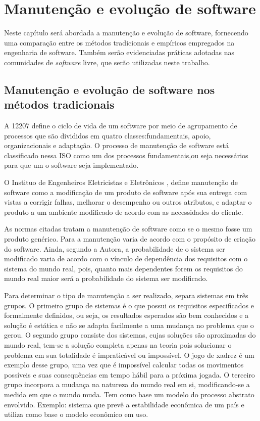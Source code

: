 \chapter{Manutenção e evolução de software}
\label{cap-evol-software}

Neste capítulo será abordada a manutenção e evolução de software, fornecendo uma comparação entre os métodos tradicionais e empíricos empregados na engenharia de software. Também serão evidenciadas práticas adotadas nas comunidades de \textit{software} livre, que serão utilizadas neste trabalho.

\section{Manutenção e evolução de software nos métodos tradicionais}
\label{sect-manut-evol-soft}

A  12207 define o ciclo de vida de um software por meio de agrupamento de processos que são divididos em quatro classes:fundamentais, apoio, organizacionais e adaptação. O processo de manutenção de software está classificado nessa ISO como um dos processos fundamentais,ou seja necessários para que um o software seja implementado.


O Instituo de Engenheiros Eletricistas e Eletrônicos , define manutenção de software como a modificação de um produto de software após sua entrega com vistas a corrigir falhas, melhorar o desempenho ou outros atributos, e adaptar o produto a um ambiente modificado de acordo com as necessidades do cliente.

As normas citadas tratam a manutenção de software como se o mesmo fosse um produto genérico. Para  a manutenção varia de acordo com o propósito de criação do software. Ainda, segundo a Autora, a probabilidade de o sistema ser modificado varia de acordo com o vínculo de dependência dos requisitos com o sistema do mundo real, pois, quanto mais dependentes forem os requisitos do mundo real maior será a probabilidade do sistema ser modificado.

Para determinar o tipo de manutenção a ser realizado,  separa sistemas em três grupos. O primeiro grupo de sistemas é o que possui os requisitos especificados e formalmente definidos, ou seja, os resultados esperados são bem conhecidos e a solução é estática e não se adapta facilmente a uma mudança no problema que o gerou. O segundo grupo consiste dos sistemas, cujas soluções são aproximadas do mundo real, tem-se a solução completa apenas na teoria pois solucionar o problema em sua totalidade é impraticável ou impossível. O jogo de xadrez é um exemplo desse grupo, uma vez que é impossível calcular todas os movimentos possíveis e suas consequências em tempo hábil para a próxima jogada. O terceiro grupo incorpora a mudança na natureza do mundo real em si,  modificando-se a medida em que o mundo muda. Tem como base um modelo do processo abstrato envolvido. Exemplo: sistema que prevê a estabilidade econômica de um país e utiliza como base o modelo econômico em uso.

